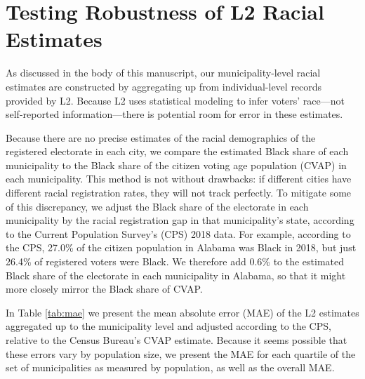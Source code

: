 \documentclass[
  12pt,
]{article}
\begin{document}
\begin{singlespace}

\end{singlespace}

\begin{singlespace}

\end{singlespace}

\begin{singlespace}

\end{singlespace}

\hypertarget{testing-robustness-of-l2-racial-estimates}{%
\section*{Testing Robustness of L2 Racial Estimates}\label{testing-robustness-of-l2-racial-estimates}}

As discussed in the body of this manuscript, our municipality-level racial estimates are constructed by aggregating up from individual-level records provided by L2. Because L2 uses statistical modeling to infer voters' race---not self-reported information---there is potential room for error in these estimates.

Because there are no precise estimates of the racial demographics of the registered electorate in each city, we compare the estimated Black share of each municipality to the Black share of the citizen voting age population (CVAP) in each municipality. This method is not without drawbacks: if different cities have different racial registration rates, they will not track perfectly. To mitigate some of this discrepancy, we adjust the Black share of the electorate in each municipality by the racial registration gap in that municipality's state, according to the Current Population Survey's (CPS) 2018 data. For example, according to the CPS, 27.0\% of the citizen population in Alabama was Black in 2018, but just 26.4\% of registered voters were Black. We therefore add 0.6\% to the estimated Black share of the electorate in each municipality in Alabama, so that it might more closely mirror the Black share of CVAP.

In Table \ref{tab:mae} we present the mean absolute error (MAE) of the L2 estimates aggregated up to the municipality level and adjusted according to the CPS, relative to the Census Bureau's CVAP estimate. Because it seems possible that these errors vary by population size, we present the MAE for each quartile of the set of municipalities as measured by population, as well as the overall MAE.
\end{document}
